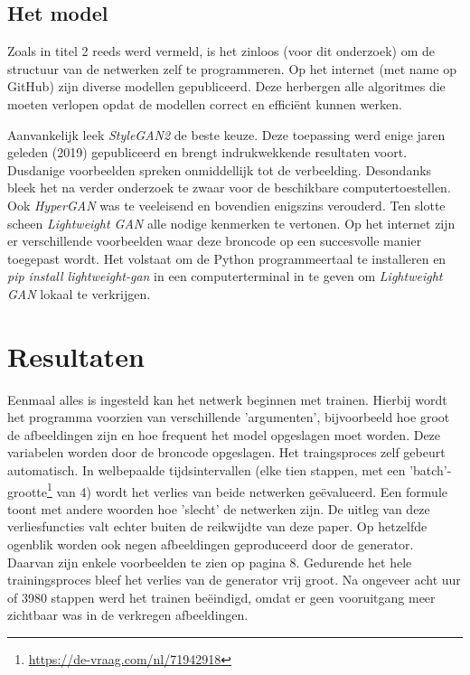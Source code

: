 \documentclass[dutch, twoside, a4paper, 10pt]{article}
\begin{document}
\subsection{Het model}
Zoals in titel 2 reeds werd vermeld, is het zinloos (voor dit onderzoek) om de structuur van de netwerken zelf te programmeren. Op het internet (met name op GitHub) zijn diverse modellen gepubliceerd. Deze herbergen alle algoritmes die moeten verlopen opdat de modellen correct en efficiënt kunnen werken.\par\bigskip\noindent
Aanvankelijk leek \textit{StyleGAN2} de beste keuze. Deze toepassing werd enige jaren geleden (2019) gepubliceerd en brengt indrukwekkende resultaten voort. Dusdanige voorbeelden spreken onmiddellijk tot de verbeelding. Desondanks bleek het na verder onderzoek te zwaar voor de beschikbare computertoestellen. Ook \textit{HyperGAN} was te veeleisend en bovendien enigszins verouderd. Ten slotte scheen \textit{Lightweight GAN} alle nodige kenmerken te vertonen. Op het internet zijn er verschillende voorbeelden waar deze broncode op een succesvolle manier toegepast wordt. Het volstaat om de Python programmeertaal te installeren en \textit{pip install lightweight-gan} in een computerterminal in te geven om \textit{Lightweight GAN} lokaal te verkrijgen.

\section{Resultaten}

\noindent Eenmaal alles is ingesteld kan het netwerk beginnen met trainen. Hierbij wordt het programma voorzien van verschillende 'argumenten', bijvoorbeeld hoe groot de afbeeldingen zijn en hoe frequent het model opgeslagen moet worden. Deze variabelen worden door de broncode opgeslagen. Het traingsproces zelf gebeurt automatisch. In welbepaalde tijdsintervallen (elke tien stappen, met een 'batch'-grootte\footnote{\url{https://de-vraag.com/nl/71942918}} van 4) wordt het verlies van beide netwerken geëvalueerd. Een formule toont met andere woorden hoe 'slecht' de netwerken zijn. De uitleg van deze verliesfuncties valt echter buiten de reikwijdte van deze paper. Op hetzelfde ogenblik worden ook negen afbeeldingen geproduceerd door de generator. Daarvan zijn enkele voorbeelden te zien op pagina 8. Gedurende het hele trainingsproces bleef het verlies van de generator vrij groot. Na ongeveer acht uur of 3980 stappen werd het trainen beëindigd, omdat er geen vooruitgang meer zichtbaar was in de verkregen afbeeldingen.
\end{document}
